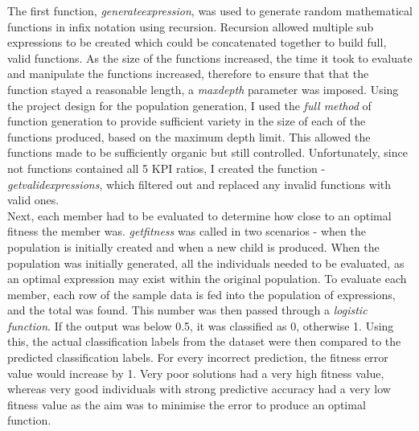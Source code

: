 \documentclass[11pt]{article}
\begin{document}
The first function, \textit{generate\textunderscore expression}, was used to generate random mathematical functions in infix notation using recursion. Recursion allowed multiple sub expressions to be created which could be concatenated together to build full, valid functions. 
As the size of the functions increased, the time it took to evaluate and manipulate the functions increased, therefore to ensure that that the function stayed a reasonable length, a \textit{max\textunderscore depth} parameter was imposed.
Using the project design for the population generation, I used the \textit{full method}\cite{ref-koz} of function generation to provide sufficient variety in the size of each of the functions produced, based on the maximum depth limit. This allowed the functions made to be sufficiently organic but still controlled. 
Unfortunately, since not functions contained all 5 KPI ratios, I created the function - \textit{get\textunderscore valid\textunderscore expressions}, which filtered out and replaced any invalid functions with valid ones. 
 \\ %
Next, each member had to be evaluated to determine how close to an optimal fitness the member was. \textit{get\textunderscore fitness} was called in two scenarios - when the population is initially created and when a new child is produced. When the population was initially generated, all the individuals needed to be evaluated, as an optimal expression may exist within the original population. To evaluate each member, each row of the sample data is fed into the population of expressions, and the total was found. This number was then passed through a \textit{logistic function}. If  the output was below 0.5, it was classified as 0, otherwise 1. Using this, the actual classification labels from the dataset were then compared to the predicted classification labels. For every incorrect prediction, the fitness error value would increase by 1. Very poor solutions had a very high fitness value, whereas very good individuals with strong predictive accuracy had a very low fitness value as the aim was to minimise the error to produce an optimal function.\\
\end{document}
